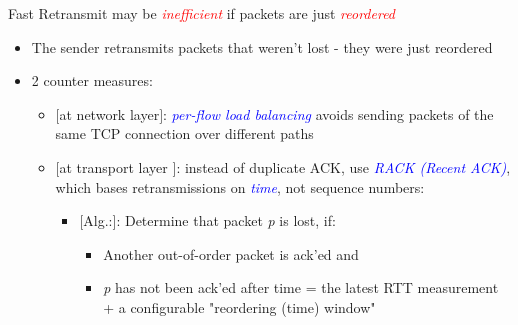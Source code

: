 \documentclass[11pt]{article}
\begin{document}
Fast Retransmit may be \textit{\textcolor{red}{inefficient}} if packets are just \textit{\textcolor{red}{reordered}}
\begin{itemize}
	\item The sender retransmits packets that weren't lost - they were just reordered 
	\item 2 counter measures:
		\begin{itemize}
			\item $[$at network layer$]$: \textit{\textcolor{blue}{per-flow load balancing}} avoids sending packets of the same TCP connection over different paths
			\item $[$at transport layer $]$: instead of duplicate ACK, use \textit{\textcolor{blue}{RACK (Recent ACK)}}, which bases retransmissions on \textit{\textcolor{blue}{time}}, not sequence numbers:
				\begin{itemize}
					\item $[$Alg.:$]$: Determine that packet \textit{p} is lost, if:
						\begin{itemize}
							\item Another out-of-order packet is ack'ed and
							\item \textit{p} has not been ack'ed after time = the latest RTT measurement + a configurable "reordering (time) window"
						\end{itemize}
				\end{itemize}

		\end{itemize}

\end{itemize}
\end{document}
